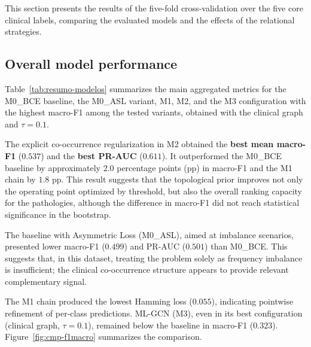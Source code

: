 \documentclass[12pt]{article}
\begin{document}
This section presents the results of the five-fold cross-validation over the five core clinical labels, comparing the evaluated models and the effects of the relational strategies.

\subsection{Overall model performance}

Table~\ref{tab:resumo-modelos} summarizes the main aggregated metrics for the M0\_BCE baseline, the M0\_ASL variant, M1, M2, and the M3 configuration with the highest macro-F1 among the tested variants, obtained with the clinical graph and $\tau=0.1$.

The explicit co-occurrence regularization in M2 obtained the \textbf{best mean macro-F1} ($0.537$) and the \textbf{best PR-AUC} ($0.611$). It outperformed the M0\_BCE baseline by approximately $2.0$ percentage points (pp) in macro-F1 and the M1 chain by $1.8$ pp. This result suggests that the topological prior improves not only the operating point optimized by threshold, but also the overall ranking capacity for the pathologies, although the difference in macro-F1 did not reach statistical significance in the bootstrap.

The baseline with Asymmetric Loss (M0\_ASL), aimed at imbalance scenarios, presented lower macro-F1 ($0.499$) and PR-AUC ($0.501$) than M0\_BCE. This suggests that, in this dataset, treating the problem solely as frequency imbalance is insufficient; the clinical co-occurrence structure appears to provide relevant complementary signal.

The M1 chain produced the lowest Hamming loss ($0.055$), indicating pointwise refinement of per-class predictions. ML-GCN (M3), even in its best configuration (clinical graph, $\tau=0.1$), remained below the baseline in macro-F1 ($0.323$). Figure~\ref{fig:cmp-f1macro} summarizes the comparison.


\end{document}
